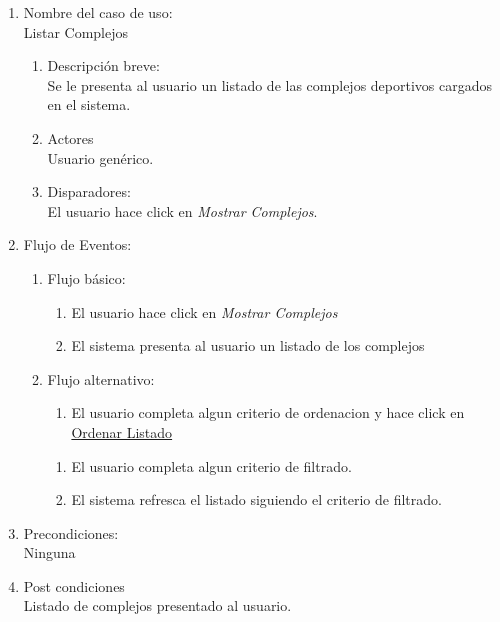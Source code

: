 \documentclass[a4paper,11pt]{article}
\begin{document}
\begin{enumerate}

    \item Nombre del caso de uso: \\
    Listar Complejos

    \begin{enumerate}
    \item Descripción breve: \\
        Se le presenta al usuario un listado de las complejos deportivos cargados en el sistema.
    \item Actores \\
        Usuario genérico.
    \item Disparadores: \\
        El usuario hace click en \emph{Mostrar Complejos}.
    \end{enumerate}

    \item Flujo de Eventos: \\

    \begin{enumerate}

        \item Flujo básico:\\          
	\begin{enumerate}
                    \item El usuario hace click en \emph{Mostrar Complejos}
                    \item El sistema presenta al usuario un listado de los complejos
        \end{enumerate}
        \item Flujo alternativo:\\
	\begin{enumerate}
                    \item El usuario completa algun criterio de ordenacion y hace click en \underline{Ordenar Listado}
        \end{enumerate}
	\begin{enumerate}
                    \item El usuario completa algun criterio de filtrado.
		\item El sistema refresca el listado siguiendo el criterio de filtrado.
        \end{enumerate}
    \end{enumerate}

    \item Precondiciones: \\
	Ninguna

    \item Post condiciones \\
        Listado de complejos presentado al usuario.

\end{enumerate}
\end{document}
